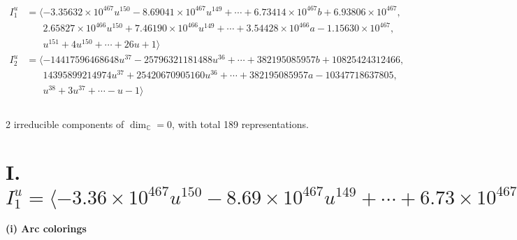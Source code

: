 \documentclass[1p]{elsarticle_modified}
\theoremstyle{definition}
\begin{document}
\begin{align*}
I^u_{1}&=\langle 
-3.35632\times10^{467} u^{150}-8.69041\times10^{467} u^{149}+\cdots+6.73414\times10^{467} b+6.93806\times10^{467},\\
\phantom{I^u_{1}}&\phantom{= \langle  }2.65827\times10^{466} u^{150}+7.46190\times10^{466} u^{149}+\cdots+3.54428\times10^{466} a-1.15630\times10^{467},\\
\phantom{I^u_{1}}&\phantom{= \langle  }u^{151}+4 u^{150}+\cdots+26 u+1\rangle \\
I^u_{2}&=\langle 
-14417596468648 u^{37}-25796321181488 u^{36}+\cdots+382195085957 b+10825424312466,\\
\phantom{I^u_{2}}&\phantom{= \langle  }14395899214974 u^{37}+25420670905160 u^{36}+\cdots+382195085957 a-10347718637805,\\
\phantom{I^u_{2}}&\phantom{= \langle  }u^{38}+3 u^{37}+\cdots- u-1\rangle \\
\\
\end{align*}
\raggedright * 2 irreducible components of $\dim_{\mathbb{C}}=0$, with total 189 representations.\\
\newpage
\renewcommand{\arraystretch}{1}
\centering \section*{I. $I^u_{1}= \langle -3.36\times10^{467} u^{150}-8.69\times10^{467} u^{149}+\cdots+6.73\times10^{467} b+6.94\times10^{467},\;2.66\times10^{466} u^{150}+7.46\times10^{466} u^{149}+\cdots+3.54\times10^{466} a-1.16\times10^{467},\;u^{151}+4 u^{150}+\cdots+26 u+1 \rangle$}
\flushleft \textbf{(i) Arc colorings}\\
\end{document}
